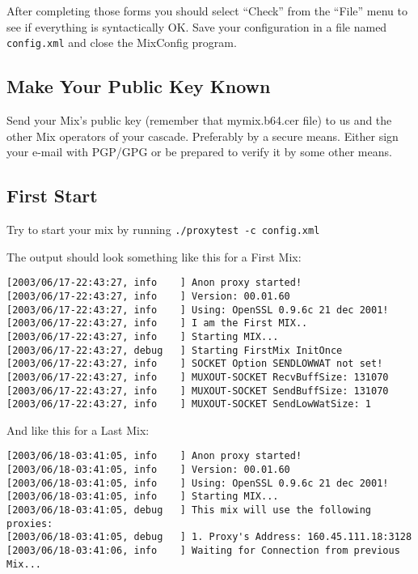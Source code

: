 \documentclass{article}
\begin{document}
After completing those forms you should select ``Check'' from the
``File'' menu to see if everything is syntactically OK. Save your
configuration in a file named \verb|config.xml| and close the
MixConfig program.

\subsection{Make Your Public Key Known}

Send your Mix's public key (remember that mymix.b64.cer file) to us
and the other Mix operators of your cascade. Preferably by a secure
means. Either sign your e-mail with PGP/GPG or be prepared to verify
it by some other means.

\subsection{First Start}

Try to start your mix by running \verb|./proxytest -c config.xml|

The output should look something like this for a First Mix:

\begin{verbatim}
[2003/06/17-22:43:27, info    ] Anon proxy started!
[2003/06/17-22:43:27, info    ] Version: 00.01.60
[2003/06/17-22:43:27, info    ] Using: OpenSSL 0.9.6c 21 dec 2001!
[2003/06/17-22:43:27, info    ] I am the First MIX..
[2003/06/17-22:43:27, info    ] Starting MIX...
[2003/06/17-22:43:27, debug   ] Starting FirstMix InitOnce
[2003/06/17-22:43:27, info    ] SOCKET Option SENDLOWWAT not set!
[2003/06/17-22:43:27, info    ] MUXOUT-SOCKET RecvBuffSize: 131070
[2003/06/17-22:43:27, info    ] MUXOUT-SOCKET SendBuffSize: 131070
[2003/06/17-22:43:27, info    ] MUXOUT-SOCKET SendLowWatSize: 1
\end{verbatim}

And like this for a Last Mix:

\begin{verbatim}
[2003/06/18-03:41:05, info    ] Anon proxy started!
[2003/06/18-03:41:05, info    ] Version: 00.01.60
[2003/06/18-03:41:05, info    ] Using: OpenSSL 0.9.6c 21 dec 2001!
[2003/06/18-03:41:05, info    ] Starting MIX...
[2003/06/18-03:41:05, debug   ] This mix will use the following proxies:
[2003/06/18-03:41:05, debug   ] 1. Proxy's Address: 160.45.111.18:3128
[2003/06/18-03:41:06, info    ] Waiting for Connection from previous Mix...
\end{verbatim}
\end{document}
